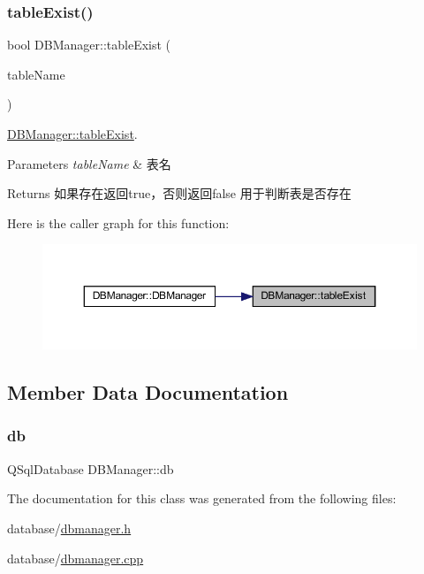 \subsubsection{\texorpdfstring{tableExist()}{tableExist()}}
{\footnotesize\ttfamily bool D\+B\+Manager\+::table\+Exist (\begin{DoxyParamCaption}\item[{const Q\+String \&}]{table\+Name }\end{DoxyParamCaption})\hspace{0.3cm}{\ttfamily [private]}}



\mbox{\hyperlink{class_d_b_manager_a95518b4ffbf5b26550b18c7f7d1e471f}{D\+B\+Manager\+::table\+Exist}}. 


\begin{DoxyParams}{Parameters}
{\em table\+Name} & 表名 \\
\hline
\end{DoxyParams}
\begin{DoxyReturn}{Returns}
如果存在返回true，否则返回false 用于判断表是否存在 
\end{DoxyReturn}
Here is the caller graph for this function\+:
\nopagebreak
\begin{figure}[H]
\begin{center}
\leavevmode
\includegraphics[width=350pt]{class_d_b_manager_a95518b4ffbf5b26550b18c7f7d1e471f_icgraph}
\end{center}
\end{figure}


\subsection{Member Data Documentation}
\mbox{\label{class_d_b_manager_a5399b255096671fc8a5dd3ebf2dd0507}} 
\subsubsection{\texorpdfstring{db}{db}}
{\footnotesize\ttfamily Q\+Sql\+Database D\+B\+Manager\+::db\hspace{0.3cm}{\ttfamily [private]}}



The documentation for this class was generated from the following files\+:\begin{DoxyCompactItemize}
\item 
database/\mbox{\hyperlink{dbmanager_8h}{dbmanager.\+h}}\item 
database/\mbox{\hyperlink{dbmanager_8cpp}{dbmanager.\+cpp}}\end{DoxyCompactItemize}

